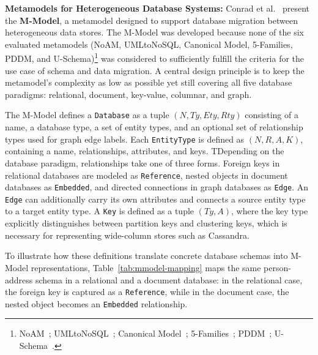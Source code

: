 
  \textbf{Metamodels for Heterogeneous Database Systems:}                                                                                               Conrad et al.~\cite{conrad2022metamodels} present the \textbf{M-Model},                                                                             a metamodel designed to support database migration between heterogeneous
  data stores. The M-Model was developed because none of the six evaluated
  metamodels (NoAM, UMLtoNoSQL, Canonical Model, 5-Families, PDDM,
  and U-Schema)\footnote{NoAM~\cite{atzeni2020data};
  UMLtoNoSQL~\cite{abdelhedi2017umltonosql};
  Canonical Model~\cite{vanhove2017data};
  5-Families~\cite{mali2020modeldrivenguide};
  PDDM~\cite{zdepski2020pddm};
  U-Schema~\cite{candel2022unified}.}
  was considered to sufficiently fulfill the criteria for the use case of
  schema and data migration.
  A central design principle is to keep the metamodel's complexity as
  low as possible yet still covering all five database paradigms:
  relational, document, key-value, columnar, and graph.



The M-Model defines a \texttt{Database} as a tuple $(N, Ty, Ety, Rty)$ consisting of a name, a database type, a set of entity types,
and an optional set of relationship types used for graph edge labels. Each \texttt{EntityType} is defined as $(N, R, A, K)$, containing a name,
relationships, attributes, and keys. TDepending on the database paradigm, relationships take one of three forms. Foreign keys in relational databases are modeled as \texttt{Reference}, nested objects in document databases as   \texttt{Embedded}, and directed connections in graph databases as \texttt{Edge}. An \texttt{Edge} can additionally carry its own attributes and connects a source entity type to a target entity type. A \texttt{Key} is defined as a tuple $(Ty, A)$, where the key type explicitly distinguishes between partition keys and clustering keys, which is necessary for representing wide-column stores such as Cassandra.

To illustrate how these definitions translate concrete database schemas
into M-Model representations, Table~\ref{tab:mmodel-mapping} maps the
same person-address schema in a relational and a document database: in the relational case, the foreign key is captured as a \texttt{Reference}, while in the document case, the nested object becomes an \texttt{Embedded} relationship.


